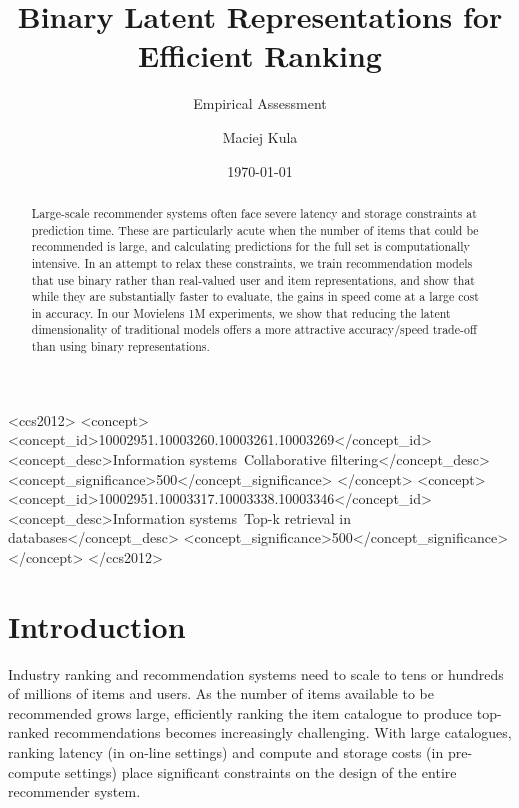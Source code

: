 \documentclass[sigchi]{acmart}
\begin{document}
\title{Binary Latent Representations for Efficient Ranking}
\subtitle{Empirical Assessment}
\author{Maciej Kula}
\date{\today}
\acmConference[]{}{}{}

\begin{CCSXML}
<ccs2012>
<concept>
<concept_id>10002951.10003260.10003261.10003269</concept_id>
<concept_desc>Information systems~Collaborative filtering</concept_desc>
<concept_significance>500</concept_significance>
</concept>
<concept>
<concept_id>10002951.10003317.10003338.10003346</concept_id>
<concept_desc>Information systems~Top-k retrieval in databases</concept_desc>
<concept_significance>500</concept_significance>
</concept>
</ccs2012>
\end{CCSXML}




\begin{abstract}
Large-scale recommender systems often face severe latency and storage constraints at prediction time. These are particularly acute when the number of items that could be recommended is large, and calculating predictions for the full set is computationally intensive. In an attempt to relax these constraints, we train recommendation models that use binary rather than real-valued user and item representations, and show that while they are substantially faster to evaluate, the gains in speed come at a large cost in accuracy. In our Movielens 1M experiments, we show that reducing the latent dimensionality of traditional models offers a more attractive accuracy/speed trade-off than using binary representations.
\end{abstract}

\maketitle

\section{Introduction}
Industry ranking and recommendation systems need to scale to tens or hundreds of millions of items and users. As the number of items available to be recommended grows large, efficiently ranking the item catalogue to produce top-ranked recommendations becomes increasingly challenging. With large catalogues, ranking latency (in on-line settings) and compute and storage costs (in pre-compute settings) place significant constraints on the design of the entire recommender system.
\end{document}
